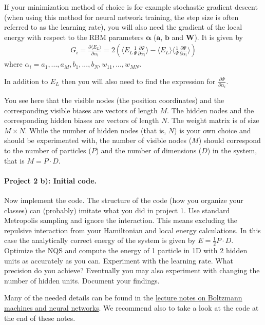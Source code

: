 \documentclass[%
oneside,                 %
final,                   %
10pt]{article}
\begin{document}
If your minimization method of choice is for example stochastic gradient descent (when using this method for neural network training, the step size is often referred to as the learning rate), you will also need the gradient of the local energy with respect to the RBM parameters $\mathbf{\alpha}$ ($\mathbf{a}$, $\mathbf{b}$ and $\mathbf{W}$). It is given by
\begin{align}
	G_i = \frac{\partial \langle E_L \rangle}{\partial \alpha_i}
	= 2(\langle E_L \frac{1}{\Psi}\frac{\partial \Psi}{\partial \alpha_i} \rangle - \langle E_L \rangle \langle \frac{1}{\Psi}\frac{\partial \Psi}{\partial \alpha_i} \rangle )
\end{align}
where $\alpha_i = a_1,...,a_M,b_1,...,b_N,w_{11},...,w_{MN}$.

In addition to $E_L$ then you will also need to find the expression for
$\frac{\partial \Psi}{\partial \alpha_i}$.

You see here that the visible nodes (the position coordinates) and the corresponding visible biases are vectors of length $M$. The hidden nodes and the corresponding hidden biases are vectors of length $N$. The weight matrix is of size $M\times N$. While the number of hidden nodes (that is, $N$) is your own choice and should be experimented with, the number of visible nodes ($M$) should correspond to the number of particles ($P$) and the number of dimensions ($D$) in the system, that is $M = P \cdot D$.

\paragraph{Project 2 b): Initial code.}
Now implement the code. The structure of the code (how you organize
your classes) can (probably) imitate what you did in project 1.  Use
standard Metropolis sampling and ignore the interaction. This means
excluding the repulsive interaction from your Hamiltonian and local
energy calculations. In this case the analytically correct energy of
the system is given by $E=\frac{1}{2}P\cdot D$.  Optimize the NQS and
compute the energy of 1 particle in 1D with 2 hidden units as
accurately as you can. Experiment with the learning rate. What
precision do you achieve?  Eventually you may also experiment with
changing the number of hidden units. Document your findings.

Many of the needed details can be found in the \href{{http://compphysics.github.io/ComputationalPhysics2/doc/LectureNotes/_build/html/boltzmannmachines.html}}{lecture notes on Boltzmann machines and neural networks}. We recommend also to take a look at the code at the end of these notes.
\end{document}
